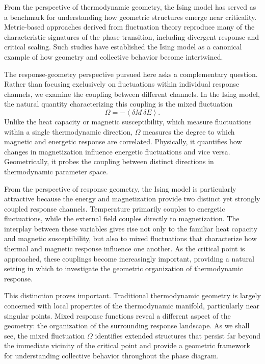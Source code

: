From the perspective of thermodynamic geometry, the Ising model has
served as a benchmark for understanding how geometric structures emerge
near criticality. Metric-based approaches derived from fluctuation
theory reproduce many of the characteristic signatures of the phase
transition, including divergent response and critical scaling. Such
studies have established the Ising model as a canonical example of how
geometry and collective behavior become intertwined.

The response-geometry perspective pursued here asks a complementary
question. Rather than focusing exclusively on fluctuations within
individual response channels, we examine the coupling between different
channels. In the Ising model, the natural quantity characterizing this
coupling is the mixed fluctuation
%
\begin{equation}
\Omega
=
-
\left\langle
\delta M \, \delta E
\right\rangle .
\end{equation}
%
Unlike the heat capacity or magnetic susceptibility, which measure
fluctuations within a single thermodynamic direction, \(\Omega\)
measures the degree to which magnetic and energetic response are
correlated. Physically, it quantifies how changes in magnetization
influence energetic fluctuations and vice versa. Geometrically, it
probes the coupling between distinct directions in thermodynamic
parameter space.

From the perspective of response geometry, the Ising model is
particularly attractive because the energy and magnetization provide
two distinct yet strongly coupled response channels. Temperature
primarily couples to energetic fluctuations, while the external field
couples directly to magnetization. The interplay between these
variables gives rise not only to the familiar heat capacity and
magnetic susceptibility, but also to mixed fluctuations that characterize
how thermal and magnetic response influence one another. As the
critical point is approached, these couplings become increasingly
important, providing a natural setting in which to investigate the
geometric organization of thermodynamic response.

This distinction proves important. Traditional thermodynamic geometry
is largely concerned with local properties of the thermodynamic
manifold, particularly near singular points. Mixed response functions
reveal a different aspect of the geometry: the organization of the
surrounding response landscape. As we shall see, the mixed fluctuation
\(\Omega\) identifies extended structures that persist far beyond the
immediate vicinity of the critical point and provide a geometric
framework for understanding collective behavior throughout the phase
diagram.


